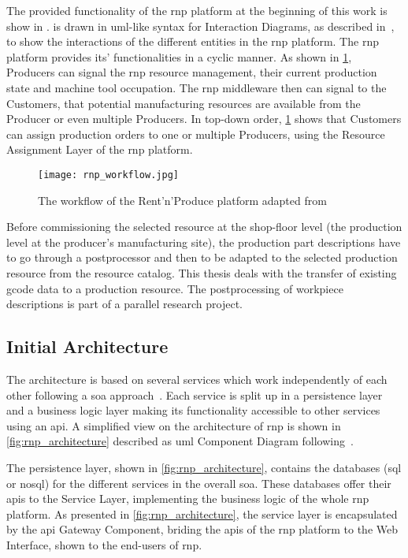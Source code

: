 \documentclass[
a4paper,
twoside,
headsepline,
cleardoublepage=empty,
parskip=half,
draft=false
]{scrbook}
\begin{document}
			The provided functionality of the \gls{rnp} platform at the beginning of this work is show in .  is drawn in \gls{uml}-like syntax for Interaction Diagrams, as described in~\cite{uml2017}, to show the interactions of the different entities in the \gls{rnp} platform. 
			The \gls{rnp} platform provides its' functionalities in a cyclic manner. 
			As shown in \cref{fig:rnp_workflow}, Producers can signal the \gls{rnp} resource management, their current production state and machine tool occupation. 
			The \gls{rnp} middleware then can signal to the Customers, that potential manufacturing resources are available from the Producer or even multiple Producers. 
			In top-down order, \cref{fig:rnp_workflow} shows that Customers can assign production orders to one or multiple Producers, using the Resource Assignment Layer of the \gls{rnp} platform.

			\begin{figure}[htbp]
				\centering
				\texttt{[image: rnp\_workflow.jpg]}
				\caption{The workflow of the Rent'n'Produce platform adapted from~\cite{ellwein2016}}
				\label{fig:rnp_workflow}
			\end{figure}

			Before commissioning the selected resource at the shop-floor level (the production level at the producer's manufacturing site), the production part descriptions have to go through a postprocessor and then to be adapted to the selected production resource from the resource catalog.
			This thesis deals with the transfer of existing \gls{gcode} data to a production resource.
			The postprocessing of workpiece descriptions is part of a parallel research project.

			\subsection{Initial Architecture}\label{subsec:initial_architecture}

			The architecture is based on several services which work independently of each other following a \gls{soa} approach~\cite{erl2008soa}.
			Each service is split up in a persistence layer and a business logic layer making its functionality accessible to other services using an \gls{api}.
			A simplified view on the architecture of \gls{rnp} is shown in \cref{fig:rnp_architecture} described as \gls{uml} Component Diagram following~\cite{uml2017}.
			
			The persistence layer, shown in \cref{fig:rnp_architecture}, contains the databases (\gls{sql} or \gls{nosql}) for the different services in the overall \gls{soa}. These databases offer their \gls{api}s to the Service Layer, implementing the business logic of the whole \gls{rnp} platform. As presented in \cref{fig:rnp_architecture}, the service layer is encapsulated by the \gls{api} Gateway Component, briding the \gls{api}s of the \gls{rnp} platform to the Web Interface, shown to the end-users of \gls{rnp}.
\end{document}
